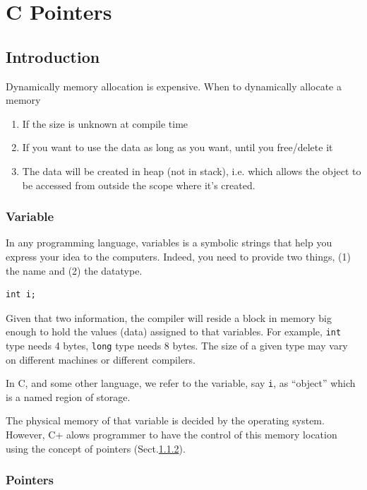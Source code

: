 
\chapter{C Pointers}
\label{chap:c-pointers}

 
\section{Introduction}
\label{sec:introduction-7}

Dynamically memory allocation is expensive. When to dynamically allocate a memory
\begin{enumerate}
  \item If the size is unknown at compile time
  \item If you want to use the data as long as you want, until you free/delete
  it
  \item The data will be created in heap (not in stack), i.e. which allows the
  object to be accessed from outside the scope where it's created.
\end{enumerate}

\subsection{Variable}
\label{sec:variable}

In any programming language, variables is a symbolic strings that help
you express your idea to the computers.  Indeed, you need to provide
two things, (1) the name and (2) the datatype.
\begin{lstlisting}
int i;
\end{lstlisting}
Given that two information, the compiler will reside a block in memory
big enough to hold the values (data) assigned to that variables. For
example, \verb!int! type needs 4 bytes, \verb!long! type needs 8
bytes. The size of a given type may vary on different machines or
different compilers.

In C, and some other language, we refer to the variable, say \verb!i!,
as ``object'' which is a named region of storage.

The physical memory of that variable is decided by the operating system.
However, C+ alows programmer to have the control of this memory location using 
the concept of pointers (Sect.\ref{sec:pointers-3}).



\subsection{Pointers}
\label{sec:pointers-3}


